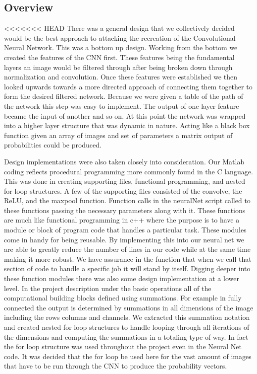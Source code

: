 \documentclass[11pt,english]{article}
\begin{document}
\subsection{Overview}

<<<<<<< HEAD
There was a general design that we collectively decided would be the best approach to attacking the recreation of the Convolutional Neural Network. This was a bottom up design. Working from the bottom we created the features of the CNN first.  These features being the fundamental layers an image would be filtered through after being broken down through normalization and convolution.  Once these features were established we then looked upwards towards a more directed approach of connecting them together to form the desired filtered network. Because we were given a table of the path of the network this step was easy to implement. The output of one layer feature became the input of another and so on. At this point the network was wrapped into a higher layer structure that was dynamic in nature.  Acting like a black box function given an array of images and set of parameters a matrix output of probabilities could be produced.  

Design implementations were also taken closely into consideration. Our Matlab coding reflects procedural programming more commonly found in the C language. This was done in creating supporting files, functional programming, and nested for loop structures.  A few of the supporting files consisted of the convolve, the ReLU, and the maxpool function. Function calls in the neuralNet script called to these functions passing the necessary parameters along with it. These functions are much like functional programming in c++ where the purpose is to have a module or block of program code that handles a particular task.  These modules come in handy for being reusable.  By implementing this into our neural net we are able to greatly reduce the number of lines in our code while at the same time making it more robust. We have assurance in the function that when we call that section of code to handle a specific job it will stand by itself.  Digging deeper into these function modules there was also some design implementation at a lower level.  In the project description under the basic operations all of the computational building blocks defined using summations. For example in fully connected the output is determined by summations in all dimensions of the image including the rows columns and channels. We extracted this summation notation and created nested for loop structures to handle looping through all iterations of the dimensions and computing the summations in a totaling type of way. In fact the for loop structure was used throughout the project even in the Neural Net code.  It was decided that the for loop be used here for the vast amount of images that have to be run through the CNN to produce the probability vectors. 
\end{document}

